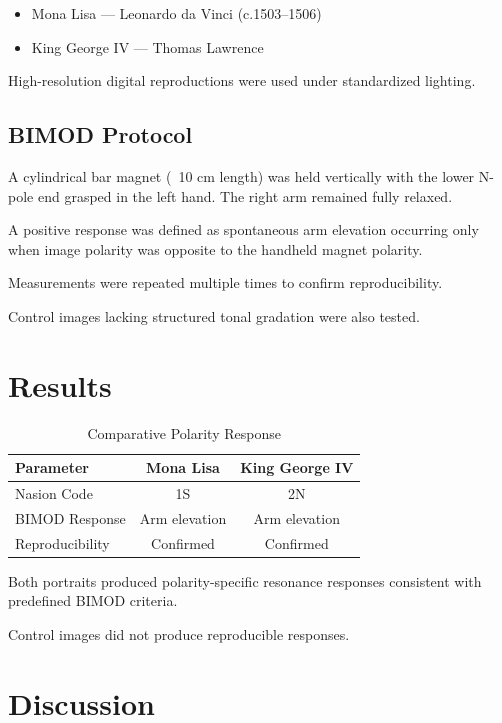 \documentclass[12pt]{article}
\begin{document}
\begin{itemize}
\item Mona Lisa — Leonardo da Vinci (c.1503–1506)
\item King George IV — Thomas Lawrence
\end{itemize}

High-resolution digital reproductions were used under standardized lighting.

\subsection{BIMOD Protocol}

A cylindrical bar magnet (~10 cm length) was held vertically with the lower N-pole end grasped in the left hand. The right arm remained fully relaxed.

A positive response was defined as spontaneous arm elevation occurring only when image polarity was opposite to the handheld magnet polarity.

Measurements were repeated multiple times to confirm reproducibility.

Control images lacking structured tonal gradation were also tested.

\section{Results}

\begin{table}[h]
\centering
\begin{tabular}{lcc}
\toprule
Parameter & Mona Lisa & King George IV \\
\midrule
Nasion Code & 1S & 2N \\
BIMOD Response & Arm elevation & Arm elevation \\
Reproducibility & Confirmed & Confirmed \\
\bottomrule
\end{tabular}
\caption{Comparative Polarity Response}
\end{table}

Both portraits produced polarity-specific resonance responses consistent with predefined BIMOD criteria.

Control images did not produce reproducible responses.

\section{Discussion}
\end{document}
